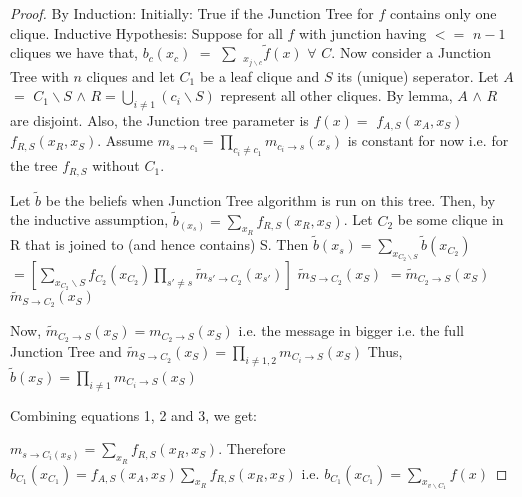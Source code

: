 \documentclass[12pt]{report}
\begin{document}
\begin{proof}
By Induction:\newline
Initially: True if the Junction Tree for $f$ contains only one clique.\newline
Inductive Hypothesis: Suppose for all $f$ with junction having $<=$ $n - 1$ cliques we have that, $b_{c}(x_{c})$ $=$ $\sum$ ${_{x_{j\backslash c}}}\tilde{f}(x)$ $\forall$ $C$. Now consider a Junction Tree with $n$ cliques and let $C_{1}$ be a leaf clique and $S$ its (unique) seperator.  Let $A$ $=$ $C_{1}\backslash S$ $\land$ $R = \bigcup _{i \neq 1} (c_{i} \backslash S)$ represent all other cliques. By lemma, $A$ $\land$ $R$ are disjoint. Also, the Junction tree parameter is $f(x) = $ $f_{A,S}(x_{A}, x_{S})$ $f_{R, S}(x_{R}, x_{S})$. Assume $m_{s\rightarrow c_{1}} = \prod _{c_{i}\neq c_{1}} m_{c_{i} \rightarrow s}(x_{s})$ is constant for now i.e. for the tree $f_{R,S}$ without $C_{1}$. %

Let $\tilde{b}$ be the beliefs when Junction Tree algorithm is run on this tree. Then, by the inductive assumption, $\tilde{b} _{(x_{s})} = \sum _{x_{R}} f _{R,S} (x_{R}, x_{S})$. Let $C_{2}$ be some clique in R that is joined to (and hence contains) S. Then
$\tilde{b}(x_{s}) = \sum _{x_{C_{2}\backslash S}} \tilde{b}(x_{C_{2}})$\newline
$= [\sum _{x_{C_{2}}\backslash S} f_{C_{2}}(x_{C_{2}}) \prod _{s' \neq s} \tilde{m} _{s'\rightarrow C_{2}} (x_{s'})]$  $\tilde{m}_{S\rightarrow C_{2}}(x_{S})$\newline
$= \tilde{m} _{C_{2} \rightarrow S} (x_{S})$ $\tilde{m} _{S \rightarrow C_{2}} (x_{S})$ %

Now, $\tilde{m} _{C_{2} \rightarrow S}(x_{S}) = m _{C_{2} \rightarrow S}(x_{S})$ i.e. the message in bigger i.e. the full Junction Tree and \newline
$\tilde{m} _{S \rightarrow C_{2}} (x_{S}) = \prod _{i \neq 1,2} m _{C_{i} \rightarrow S} (x_{S})$\newline
Thus,  $\tilde{b} (x_{S}) = \prod _{i \neq 1} m _{C_{i} \rightarrow S} (x_{S})$%

Combining equations 1, 2 and 3, we get:

$m_{s\rightarrow C_{i}(x_{S})} = \sum _{x_{R}} f_{R, S} (x_{R}, x_{S})$.\newline
Therefore $b_{C_{1}} (x_{C_{1}}) = f _{A,S}(x_{A}, x_{S}) \sum _{x_{R}} f_{R,S}(x_{R},x_{S})$ i.e. $b_{C_{1}}(x_{C_{1}}) = \sum _{x_{v \backslash C_{1}}} f(x)$
\end{proof}
\end{document}
